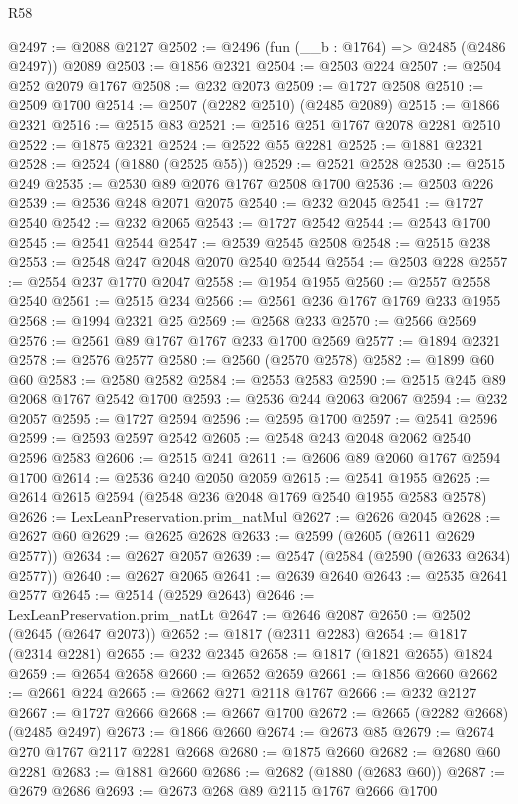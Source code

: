 \begin{lexlean}{R58}
\begin{coremodule}
@2497 := @2088 @2127
@2502 := @2496 (fun (__b : @1764) => @2485 (@2486 @2497)) @2089
@2503 := @1856 @2321
@2504 := @2503 @224
@2507 := @2504 @252 @2079 @1767
@2508 := @232 @2073
@2509 := @1727 @2508
@2510 := @2509 @1700
@2514 := @2507 (@2282 @2510) (@2485 @2089)
@2515 := @1866 @2321
@2516 := @2515 @83
@2521 := @2516 @251 @1767 @2078 @2281 @2510
@2522 := @1875 @2321
@2524 := @2522 @55 @2281
@2525 := @1881 @2321
@2528 := @2524 (@1880 (@2525 @55))
@2529 := @2521 @2528
@2530 := @2515 @249
@2535 := @2530 @89 @2076 @1767 @2508 @1700
@2536 := @2503 @226
@2539 := @2536 @248 @2071 @2075
@2540 := @232 @2045
@2541 := @1727 @2540
@2542 := @232 @2065
@2543 := @1727 @2542
@2544 := @2543 @1700
@2545 := @2541 @2544
@2547 := @2539 @2545 @2508
@2548 := @2515 @238
@2553 := @2548 @247 @2048 @2070 @2540 @2544
@2554 := @2503 @228
@2557 := @2554 @237 @1770 @2047
@2558 := @1954 @1955
@2560 := @2557 @2558 @2540
@2561 := @2515 @234
@2566 := @2561 @236 @1767 @1769 @233 @1955
@2568 := @1994 @2321 @25
@2569 := @2568 @233
@2570 := @2566 @2569
@2576 := @2561 @89 @1767 @1767 @233 @1700 @2569
@2577 := @1894 @2321
@2578 := @2576 @2577
@2580 := @2560 (@2570 @2578)
@2582 := @1899 @60 @60
@2583 := @2580 @2582
@2584 := @2553 @2583
@2590 := @2515 @245 @89 @2068 @1767 @2542 @1700
@2593 := @2536 @244 @2063 @2067
@2594 := @232 @2057
@2595 := @1727 @2594
@2596 := @2595 @1700
@2597 := @2541 @2596
@2599 := @2593 @2597 @2542
@2605 := @2548 @243 @2048 @2062 @2540 @2596 @2583
@2606 := @2515 @241
@2611 := @2606 @89 @2060 @1767 @2594 @1700
@2614 := @2536 @240 @2050 @2059
@2615 := @2541 @1955
@2625 := @2614 @2615 @2594 (@2548 @236 @2048 @1769 @2540 @1955 @2583 @2578)
@2626 := LexLeanPreservation.prim_natMul
@2627 := @2626 @2045
@2628 := @2627 @60
@2629 := @2625 @2628
@2633 := @2599 (@2605 (@2611 @2629 @2577))
@2634 := @2627 @2057
@2639 := @2547 (@2584 (@2590 (@2633 @2634) @2577))
@2640 := @2627 @2065
@2641 := @2639 @2640
@2643 := @2535 @2641 @2577
@2645 := @2514 (@2529 @2643)
@2646 := LexLeanPreservation.prim_natLt
@2647 := @2646 @2087
@2650 := @2502 (@2645 (@2647 @2073))
@2652 := @1817 (@2311 @2283)
@2654 := @1817 (@2314 @2281)
@2655 := @232 @2345
@2658 := @1817 (@1821 @2655) @1824
@2659 := @2654 @2658
@2660 := @2652 @2659
@2661 := @1856 @2660
@2662 := @2661 @224
@2665 := @2662 @271 @2118 @1767
@2666 := @232 @2127
@2667 := @1727 @2666
@2668 := @2667 @1700
@2672 := @2665 (@2282 @2668) (@2485 @2497)
@2673 := @1866 @2660
@2674 := @2673 @85
@2679 := @2674 @270 @1767 @2117 @2281 @2668
@2680 := @1875 @2660
@2682 := @2680 @60 @2281
@2683 := @1881 @2660
@2686 := @2682 (@1880 (@2683 @60))
@2687 := @2679 @2686
@2693 := @2673 @268 @89 @2115 @1767 @2666 @1700

\end{coremodule}
\end{lexlean}
